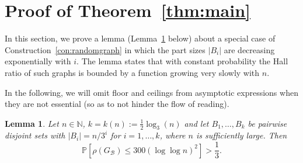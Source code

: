 \documentclass[a4paper,10pt]{amsart}
\newtheorem{lemma}[theorem]{Lemma}
\begin{document}
\section{Proof of Theorem~\ref{thm:main}}\label{sec:main1}

In this section, we prove a lemma (Lemma~\ref{lem:smallish} below) about a special case of Construction~\ref{con:randomgraph} in which the part sizes $|B_i|$ are decreasing exponentially with $i$. The lemma states that with constant probability the Hall ratio of such graphs is bounded by a function growing very slowly with $n$.

In the following, we will omit floor and ceilings from asymptotic expressions when they are not essential (so as to not hinder the flow of reading). 

\begin{lemma}\label{lem:smallish}
Let $n\in \mathbb{N}$,  $k=k(n):=\frac{1}{2}\log_{3}(n)$ and let $B_1,\ldots,B_k$ be pairwise disjoint sets with $|B_i|=n/3^i$ for $i=1,\ldots,k$, where $n$ is sufficiently large. Then $$\mathbb{P}[\rho(G_{\mathcal{B}})\le 300 (\log \log n)^2]>\frac{1}{3}.$$
\end{lemma}
\end{document}
